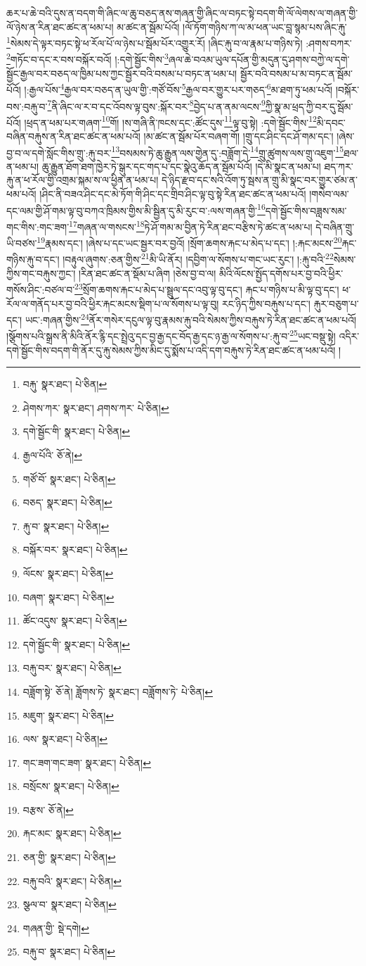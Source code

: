 ཆར་པ་ཆེ་བའི་དུས་ན་བདག་གི་ཞིང་ལ་ཆུ་བཅད་ནས་གཞན་གྱི་ཞིང་ལ་བཏང་སྟེ་བདག་གི་ལོ་ལེགས་ལ་གཞན་གྱི་ལོ་ཉེས་ན་རིན་ཐང་ཚང་ན་ཕམ་པ། མ་ཚང་ན་སྦོམ་པོའོ། །ལོ་ཏོག་གཉིས་ཀ་ལ་མ་ཕན་ཡང་བླ་སྙམ་པས་ཞིང་རྐུ་\footnote{བརྐུ་  སྣར་ཐང་།  པེ་ཅིན། }སེམས་དེ་ལྟར་བཏང་སྟེ་ཕ་རོལ་པོ་ལ་ཉེས་པ་སྦོམ་པོར་འགྱུར་རོ། །ཞིང་རྐུ་བ་ལ་རྣམ་པ་གཉིས་ཏེ། :ཤགས་བཀར་\footnote{ཤེགས་ཀར་  སྣར་ཐང་། ཤགས་ཀར་  པེ་ཅིན། }གཏོང་བ་དང་ར་བས་བསྐོར་བའོ། །:དགེ་སྦྱོང་གིས་\footnote{དགེ་སྦྱོང་གི་  སྣར་ཐང་།  པེ་ཅིན། }ཞལ་ཆེ་བའམ་ཡུལ་དཔོན་གྱི་མདུན་དུ་ཤགས་བཀྱེ་ལ་དགེ་སྦྱོང་རྒྱལ་བར་བཅད་ལ་ཁྱིམ་པས་ཀྱང་སྦྱོར་བའི་བསམ་པ་བཏང་ན་ཕམ་པ། སྦྱོར་བའི་བསམ་པ་མ་བཏང་ན་སྦོམ་པོའོ། །:རྒྱལ་པོས་\footnote{རྒྱལ་པོའི་  ཅོ་ནེ། }རྒྱལ་བར་བཅད་ན་ཡུལ་གྱི་:གཙོ་བོས་\footnote{གཙོ་བོ་  སྣར་ཐང་།  པེ་ཅིན། }རྒྱལ་བར་གྱུར་པར་གཅད་\footnote{བཅད་  སྣར་ཐང་།  པེ་ཅིན། }མ་ཐག་ཏུ་ཕམ་པའོ། །བསྐོར་བས་:བརྐུ་བ་\footnote{རྐུ་བ་  སྣར་ཐང་།  པེ་ཅིན། }ནི་ཞིང་ལ་ར་བ་དང་འོབས་ལྟ་བུས་:སྐོར་བར་\footnote{བསྐོར་བར་  སྣར་ཐང་།  པེ་ཅིན། }བྱེད་པ་ན་ནམ་ལངས་\footnote{ལོངས་  སྣར་ཐང་།  པེ་ཅིན། }ཀྱི་སྣ་མ་ཕྲད་ཀྱི་བར་དུ་སྦོམ་པོའོ། །ཕྲད་ན་ཕམ་པར་གཞག་\footnote{བཞག་  སྣར་ཐང་།  པེ་ཅིན། }གོ། །ས་གཞི་ནི་ཁངས་དང་:ཚོང་དུས་\footnote{ཚོང་འདུས་  སྣར་ཐང་།  པེ་ཅིན། }ལྟ་བུ་སྟེ། :དགེ་སྦྱོང་གིས་\footnote{དགེ་སྦྱོང་གི་  སྣར་ཐང་།  པེ་ཅིན། }མི་དབང་བཞིན་བརྐུས་ན་རིན་ཐང་ཚང་ན་ཕམ་པའོ། །མ་ཚང་ན་སྦོམ་པོར་བཞག་གོ། །གྲུ་དང་ཤིང་དང་ཤོ་གམ་དང་། །ཞེས་བྱ་བ་ལ་དགེ་སློང་གིས་གྲུ་:རྐུ་བར་\footnote{བརྐུ་བར་  སྣར་ཐང་།  པེ་ཅིན། }བསམས་ཏེ་ཆུ་རྒྱུན་ལས་གྱེན་དུ་:བཟློག་དེ་\footnote{བཟློག་སྟེ་  ཅོ་ནེ། ཟློགས་ཏེ་  སྣར་ཐང་། བཟློགས་ཏེ་  པེ་ཅིན། }གྲུ་ཚུགས་ལས་གྲུ་འཇུག་\footnote{མཇུག་  སྣར་ཐང་།  པེ་ཅིན། }ཐལ་ན་ཕམ་པ། ཆུ་རྒྱུན་ཐོག་ཐག་ཁྱེར་ཏེ་སྒུར་དང་གད་པ་དང་སྣེའུ་ཆོད་ན་སྦོམ་པོའོ། །དེ་མི་སྣང་ན་ཕམ་པ། ཐད་ཀར་རྐུ་ན་ཕ་རོལ་གྱི་འགྲམ་སྐམ་ས་ལ་ཕྱིན་ན་ཕམ་པ། དེ་ཉིད་རྫབ་དང་སའི་འོག་ཏུ་སྦས་ན་གྲུ་མི་སྣང་བར་གྱུར་ཙམ་ན་ཕམ་པའོ། །ཤིང་ནི་བཟའ་ཤིང་དང་མེ་ཏོག་གི་ཤིང་དང་གྲིབ་ཤིང་ལྟ་བུ་སྟེ་རིན་ཐང་ཚང་ན་ཕམ་པའོ། །གསེབ་ལམ་དང་ལམ་གྱི་ཤོ་གམ་ལྟ་བུ་བཀའ་ཁྲིམས་གྱིས་མི་སྦྱིན་དུ་མི་རུང་བ་:ལས་གཞན་གྱི་\footnote{ལས་  སྣར་ཐང་།  པེ་ཅིན། }དགེ་སྦྱོང་གིས་བཟླས་སམ་གང་གིས་:གང་ཟག་\footnote{གང་ཟག་གང་ཟག་  སྣར་ཐང་།  པེ་ཅིན། }གཞན་ལ་གསངས་\footnote{བསྲོངས་  སྣར་ཐང་།  པེ་ཅིན། }ཏེ་ཤོ་གམ་མ་བྱིན་ཏེ་རིན་ཐང་བརྩིས་ཏེ་ཚང་ན་ཕམ་པ། དེ་བཞིན་གྲུ་ཡི་བཙས་\footnote{བརྩས་  ཅོ་ནེ། }རྣམས་དང་། །ཞེས་པ་དང་ཡང་སྦྱར་བར་བྱའོ། །སྲོག་ཆགས་རྐང་པ་མེད་པ་དང་། །:རྐང་མངས་\footnote{རྐང་མང་  སྣར་ཐང་།  པེ་ཅིན། }རྐང་གཉིས་རྐུ་བ་དང་། །བརྟུལ་ཞུགས་:ཅན་གྱིས་\footnote{ཅན་གྱི་  སྣར་ཐང་།  པེ་ཅིན། }མི་ཡི་ནོར། །དབྱིག་ལ་སོགས་པ་གང་ཡང་རུང་། །:རྐུ་བའི་\footnote{བརྐུ་བའི་  སྣར་ཐང་།  པེ་ཅིན། }སེམས་ཀྱིས་གང་བརྐུས་ཀྱང་། །རིན་ཐང་ཚང་ན་སྡོམ་པ་ཞིག །ཅེས་བྱ་བ་ལ། མིའི་ལོངས་སྤྱོད་དགོས་པར་བྱ་བའི་ཕྱིར་གསོས་ཤིང་:བཙལ་བ་\footnote{སྩལ་བ་  སྣར་ཐང་།  པེ་ཅིན། }སྲོག་ཆགས་རྐང་པ་མེད་པ་སྦྲུལ་དང་འབུ་ལྟ་བུ་དང་། རྐང་པ་གཉིས་པ་མི་ལྟ་བུ་དང་། ཕ་རོལ་ལ་གནོད་པར་བྱ་བའི་ཕྱིར་རྐང་མངས་སྡིག་པ་ལ་སོགས་པ་ལྟ་བུ། རང་ཉིད་ཀྱིས་བརྐུས་པ་དང་། རྐུར་བཅུག་པ་དང་། ཡང་:གཞན་གྱིས་\footnote{གཞན་གྱི་  སྡེ་དགེ། }ནོར་གསེར་དངུལ་ལྟ་བུ་རྣམས་རྐུ་བའི་སེམས་ཀྱིས་བརྐུས་ཏེ་རིན་ཐང་ཚང་ན་ཕམ་པའོ། །སྩོགས་པའི་སྒྲས་ནི་མིའི་ནོར་རྙི་དང་སྤྲེའུ་དང་བྱ་རྒྱ་དང་བོད་རྒྱ་དང་ཉ་རྒྱ་ལ་སོགས་པ་:རྐུ་བ་\footnote{བརྐུ་བ་  སྣར་ཐང་།  པེ་ཅིན། }ཡང་བསྡུ་སྟེ། འདིར་དགེ་སྦྱོང་གིས་བདག་གི་ནོར་དུ་རྐུ་སེམས་ཀྱིས་མིང་དུ་སྨོས་པ་འདི་དག་བརྐུས་ཏེ་རིན་ཐང་ཚང་ན་ཕམ་པའོ། །
